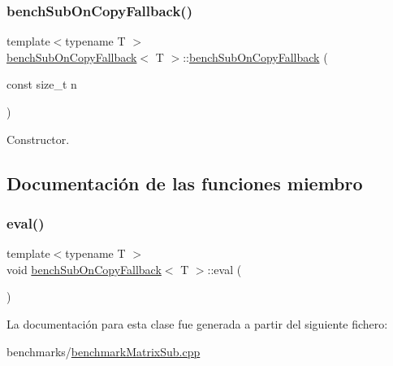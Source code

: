 \subsubsection{\texorpdfstring{bench\+Sub\+On\+Copy\+Fallback()}{benchSubOnCopyFallback()}}
{\footnotesize\ttfamily template$<$typename T $>$ \\
\hyperlink{classbenchSubOnCopyFallback}{bench\+Sub\+On\+Copy\+Fallback}$<$ T $>$\+::\hyperlink{classbenchSubOnCopyFallback}{bench\+Sub\+On\+Copy\+Fallback} (\begin{DoxyParamCaption}\item[{const size\+\_\+t}]{n }\end{DoxyParamCaption})\hspace{0.3cm}{\ttfamily [inline]}}



Constructor. 



\subsection{Documentación de las funciones miembro}
\mbox{\label{classbenchSubOnCopyFallback_a878686956dd5f8d951ba541155c1e68b}} 
\subsubsection{\texorpdfstring{eval()}{eval()}}
{\footnotesize\ttfamily template$<$typename T $>$ \\
void \hyperlink{classbenchSubOnCopyFallback}{bench\+Sub\+On\+Copy\+Fallback}$<$ T $>$\+::eval (\begin{DoxyParamCaption}{ }\end{DoxyParamCaption})\hspace{0.3cm}{\ttfamily [inline]}}



La documentación para esta clase fue generada a partir del siguiente fichero\+:\begin{DoxyCompactItemize}
\item 
benchmarks/\hyperlink{benchmarkMatrixSub_8cpp}{benchmark\+Matrix\+Sub.\+cpp}\end{DoxyCompactItemize}
